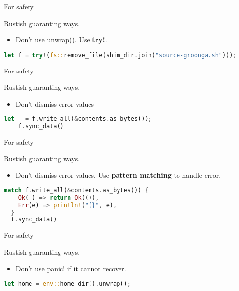 \documentclass[12pt, unicode]{beamer}
\begin{document}
\begin{frame}[fragile]{For safety}
  \begin{block}{}
    Rustish guaranting ways.
  \end{block}
\begin{itemize}
\item<1-> Don't use unwrap(). Use \textbf{try!}.
\end{itemize}
  \begin{lstlisting}[language={Rust},basicstyle=\ttfamily\SSmall]
    let f = try!(fs::remove_file(shim_dir.join("source-groonga.sh")));
  \end{lstlisting}
\end{frame}

\begin{frame}[fragile]{For safety}
  \begin{block}{}
    Rustish guaranting ways.
  \end{block}
\begin{itemize}
\item<1-> Don't dismiss error values
\end{itemize}
  \begin{lstlisting}[language={Rust},basicstyle=\ttfamily\SSmall]
    let _ = f.write_all(&contents.as_bytes());
    f.sync_data()
  \end{lstlisting}
\end{frame}

\begin{frame}[fragile]{For safety}
  \begin{block}{}
    Rustish guaranting ways.
  \end{block}
\begin{itemize}
\item<1-> Don't dismiss error values. Use \textbf{pattern matching} to handle error.
\end{itemize}
\begin{lstlisting}[language={Rust},basicstyle=\ttfamily\SSmall]
  match f.write_all(&contents.as_bytes()) {
    Ok(_) => return Ok(()),
    Err(e) => println!("{}", e),
  }
  f.sync_data()
  \end{lstlisting}
\end{frame}

\begin{frame}[fragile]{For safety}
  \begin{block}{}
    Rustish guaranting ways.
  \end{block}
\begin{itemize}
\item<1-> Don't use panic! if it cannot recover.
\end{itemize}
  \begin{lstlisting}[language={Rust},basicstyle=\ttfamily\SSmall]
    let home = env::home_dir().unwrap();
  \end{lstlisting}
\end{frame}
\end{document}
